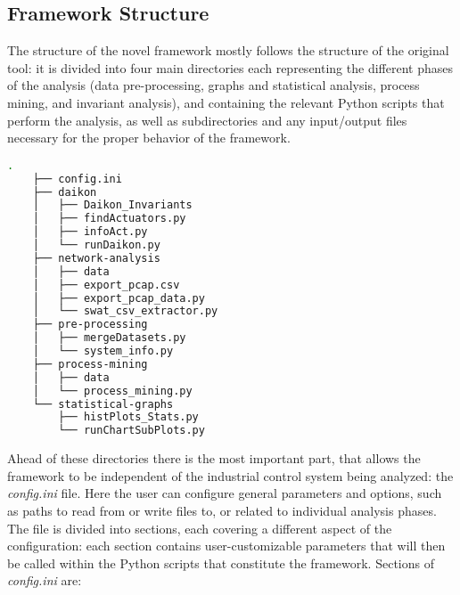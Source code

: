 \subsection{Framework Structure}
\label{subsec:framework_struct}
The structure of the novel framework mostly follows the structure of the original tool: it is divided into four main directories each representing the different phases of the analysis (data pre-processing, graphs and statistical analysis, process mining, and invariant analysis), and containing the relevant Python scripts that perform the analysis, as well as subdirectories and any input/output files necessary for the proper behavior of the framework.

\begin{lstlisting}[language=bash, numbers=none, caption=Novel Framework structure, label=lst:4_tree_command]
	.
	├── config.ini
	├── daikon
	│   ├── Daikon_Invariants
	│   ├── findActuators.py
	│   ├── infoAct.py
	│   └── runDaikon.py
	├── network-analysis
	│   ├── data
	│   ├── export_pcap.csv
	│   ├── export_pcap_data.py
	│   └── swat_csv_extractor.py
	├── pre-processing
	│   ├── mergeDatasets.py
	│   └── system_info.py
	├── process-mining
	│   ├── data
	│   └── process_mining.py
	└── statistical-graphs
	    ├── histPlots_Stats.py
	    └── runChartSubPlots.py
\end{lstlisting}

Ahead of these directories there is the most important part, that allows the framework to be independent of the industrial control system being analyzed: the \textit{config.ini} file. Here the user can configure general parameters and options, such as paths to read from or write files to, or related to individual analysis phases.\newline
The file is divided into sections, each covering a different aspect of 
the configuration: each section contains user-customizable parameters 
that will then be called within the Python scripts that constitute the framework. Sections of \textit{config.ini} are:

